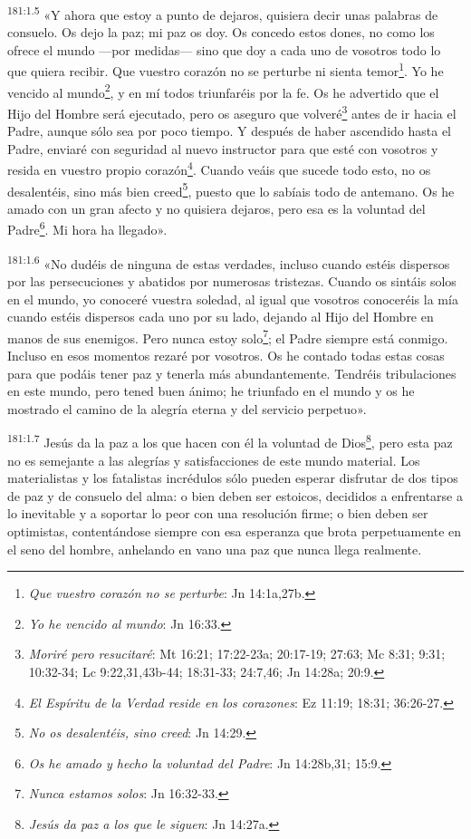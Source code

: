 \par 
\textsuperscript{181:1.5} «Y ahora que estoy a punto de dejaros, quisiera decir unas palabras de consuelo. Os dejo la paz; mi paz os doy. Os concedo estos dones, no como los ofrece el mundo ---por medidas--- sino que doy a cada uno de vosotros todo lo que quiera recibir. Que vuestro corazón no se perturbe ni sienta temor\footnote{\textit{Que vuestro corazón no se perturbe}: Jn 14:1a,27b.}. Yo he vencido al mundo\footnote{\textit{Yo he vencido al mundo}: Jn 16:33.}, y en mí todos triunfaréis por la fe. Os he advertido que el Hijo del Hombre será ejecutado, pero os aseguro que volveré\footnote{\textit{Moriré pero resucitaré}: Mt 16:21; 17:22-23a; 20:17-19; 27:63; Mc 8:31; 9:31; 10:32-34; Lc 9:22,31,43b-44; 18:31-33; 24:7,46; Jn 14:28a; 20:9.} antes de ir hacia el Padre, aunque sólo sea por poco tiempo. Y después de haber ascendido hasta el Padre, enviaré con seguridad al nuevo instructor para que esté con vosotros y resida en vuestro propio corazón\footnote{\textit{El Espíritu de la Verdad reside en los corazones}: Ez 11:19; 18:31; 36:26-27.}. Cuando veáis que sucede todo esto, no os desalentéis, sino más bien creed\footnote{\textit{No os desalentéis, sino creed}: Jn 14:29.}, puesto que lo sabíais todo de antemano. Os he amado con un gran afecto y no quisiera dejaros, pero esa es la voluntad del Padre\footnote{\textit{Os he amado y hecho la voluntad del Padre}: Jn 14:28b,31; 15:9.}. Mi hora ha llegado».

\par 
\textsuperscript{181:1.6} «No dudéis de ninguna de estas verdades, incluso cuando estéis dispersos por las persecuciones y abatidos por numerosas tristezas. Cuando os sintáis solos en el mundo, yo conoceré vuestra soledad, al igual que vosotros conoceréis la mía cuando estéis dispersos cada uno por su lado, dejando al Hijo del Hombre en manos de sus enemigos. Pero nunca estoy solo\footnote{\textit{Nunca estamos solos}: Jn 16:32-33.}; el Padre siempre está conmigo. Incluso en esos momentos rezaré por vosotros. Os he contado todas estas cosas para que podáis tener paz y tenerla más abundantemente. Tendréis tribulaciones en este mundo, pero tened buen ánimo; he triunfado en el mundo y os he mostrado el camino de la alegría eterna y del servicio perpetuo».

\par 
\textsuperscript{181:1.7} Jesús da la paz a los que hacen con él la voluntad de Dios\footnote{\textit{Jesús da paz a los que le siguen}: Jn 14:27a.}, pero esta paz no es semejante a las alegrías y satisfacciones de este mundo material. Los materialistas y los fatalistas incrédulos sólo pueden esperar disfrutar de dos tipos de paz y de consuelo del alma: o bien deben ser estoicos, decididos a enfrentarse a lo inevitable y a soportar lo peor con una resolución firme; o bien deben ser optimistas, contentándose siempre con esa esperanza que brota perpetuamente en el seno del hombre, anhelando en vano una paz que nunca llega realmente.

